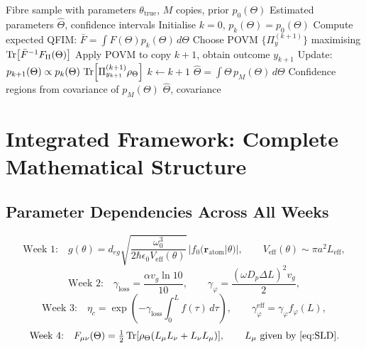 \documentclass[12pt,a4paper]{article}
\theoremstyle{definition}
\theoremstyle{plain}
\begin{document}
\begin{algorithm}[H]
\caption{Channel Parameter Estimation Protocol}
\begin{algorithmic}[1]
\Require Fibre sample with parameters $\theta_{\mathrm{true}}$, $M$ copies, prior $p_0(\Theta)$
\Ensure Estimated parameters $\hat\Theta$, confidence intervals
\State Initialise $k=0$, $p_k(\Theta)=p_0(\Theta)$
  \State Compute expected QFIM: $\bar{F}=\int F(\Theta)p_k(\Theta)\,d\Theta$
  \State Choose POVM $\{\Pi_y^{(k+1)}\}$ maximising $\Tr[\bar{F}^{-1}F_\Pi(\Theta)]$
  \State Apply POVM to copy $k+1$, obtain outcome $y_{k+1}$
  \State Update: $p_{k+1}(\Theta)\propto p_k(\Theta)\,\Tr[\Pi_{y_{k+1}}^{(k+1)}\rho_\Theta]$
  \State $k\leftarrow k+1$
\EndWhile
\State $\hat\Theta=\int\Theta\,p_M(\Theta)\,d\Theta$
\State Confidence regions from covariance of $p_M(\Theta)$
\Return $\hat\Theta$, covariance
\end{algorithmic}
\end{algorithm}

\section{Integrated Framework: Complete Mathematical Structure}

\subsection{Parameter Dependencies Across All Weeks}

\begin{equation}
\text{Week 1:}\quad g(\theta)=d_{eg}\sqrt{\frac{\omega_0^3}{2\hbar\epsilon_0 V_{\mathrm{eff}}(\theta)}}\,|f_0(\mathbf{r}_{\mathrm{atom}}|\theta)|,\qquad
V_{\mathrm{eff}}(\theta)\sim\pi a^2 L_{\mathrm{eff}},
\end{equation}
\begin{equation}
\text{Week 2:}\quad\gamma_{\mathrm{loss}}=\frac{\alpha v_g\ln10}{10},\qquad
\gamma_\varphi=\frac{(\omega D_p\Delta L)^2 v_g}{2},
\end{equation}
\begin{equation}
\text{Week 3:}\quad\eta_c=\exp\!\left(-\gamma_{\mathrm{loss}}\int_0^L f(\tau)\,d\tau\right),\qquad
\gamma_\varphi^{\mathrm{eff}}=\gamma_\varphi f_\varphi(L),
\end{equation}
\begin{equation}
\text{Week 4:}\quad F_{\mu\nu}(\Theta)=\tfrac{1}{2}\Tr[\rho_\Theta(L_\mu L_\nu+L_\nu L_\mu)],\qquad
L_\mu\text{ given by \cref{eq:SLD}}.
\end{equation}
\end{document}
